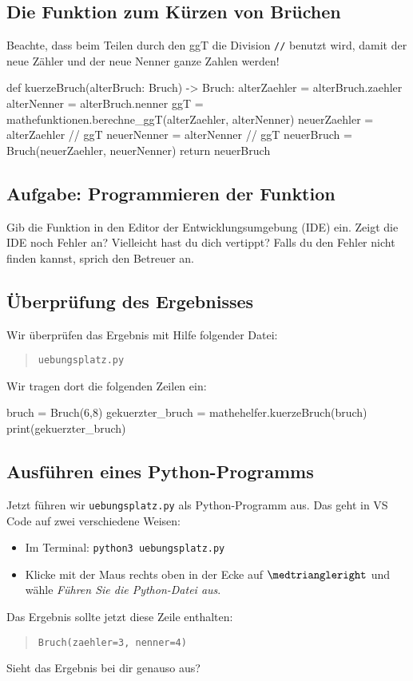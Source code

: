\subsection*{Die Funktion zum Kürzen von Brüchen}
\label{sec:FunktionKuerzen}

Beachte, dass beim Teilen durch den ggT die Division \texttt{//} benutzt wird, damit der neue Zähler und der neue Nenner ganze Zahlen werden!

\begin{codePython}
def kuerzeBruch(alterBruch: Bruch) -> Bruch:
	alterZaehler = alterBruch.zaehler
	alterNenner = alterBruch.nenner
	ggT = mathefunktionen.berechne_ggT(alterZaehler, alterNenner)
	neuerZaehler = alterZaehler // ggT
	neuerNenner = alterNenner // ggT
	neuerBruch = Bruch(neuerZaehler, neuerNenner)
	return neuerBruch
\end{codePython}

\subsection*{Aufgabe: Programmieren der Funktion}

Gib die Funktion in den Editor der Entwicklungsumgebung (IDE) ein. Zeigt die IDE noch Fehler an? Vielleicht hast du dich vertippt? Falls du den Fehler nicht finden kannst, sprich den Betreuer an.

\subsection*{Überprüfung des Ergebnisses}

Wir überprüfen das Ergebnis mit Hilfe folgender Datei:

\begin{quote}
\texttt{uebungsplatz.py}
\end{quote}

Wir tragen dort die folgenden Zeilen ein:

\begin{codePython}
bruch = Bruch(6,8)
gekuerzter_bruch = mathehelfer.kuerzeBruch(bruch)
print(gekuerzter_bruch)
\end{codePython}

\subsection*{Ausführen eines Python-Programms}

Jetzt führen wir \texttt{uebungsplatz.py} als Python-Programm aus. Das geht in VS Code auf zwei verschiedene Weisen:

\begin{itemize}
	\item Im Terminal: \texttt{python3 uebungsplatz.py}
	\item Klicke mit der Maus rechts oben in der Ecke auf $\medtriangleright$ und wähle \textit{Führen Sie die Python-Datei aus}.
\end{itemize}


Das Ergebnis sollte jetzt diese Zeile enthalten:
\begin{quote}
\texttt{Bruch(zaehler=3, nenner=4)}
\end{quote}

Sieht das Ergebnis bei dir genauso aus?


